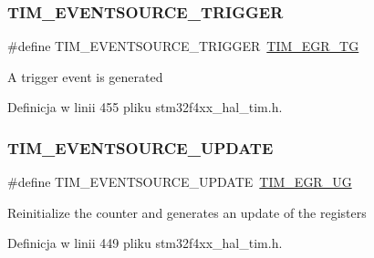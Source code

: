 \subsubsection{\texorpdfstring{T\+I\+M\+\_\+\+E\+V\+E\+N\+T\+S\+O\+U\+R\+C\+E\+\_\+\+T\+R\+I\+G\+G\+ER}{TIM\_EVENTSOURCE\_TRIGGER}}
{\footnotesize\ttfamily \#define T\+I\+M\+\_\+\+E\+V\+E\+N\+T\+S\+O\+U\+R\+C\+E\+\_\+\+T\+R\+I\+G\+G\+ER~\hyperlink{group___peripheral___registers___bits___definition_ga2eabface433d6adaa2dee3df49852585}{T\+I\+M\+\_\+\+E\+G\+R\+\_\+\+TG}}

A trigger event is generated 

Definicja w linii 455 pliku stm32f4xx\+\_\+hal\+\_\+tim.\+h.

\mbox{\label{group___t_i_m___event___source_ga6b9d1352735d2ddbafcaa31ae05cd1ee}} 
\subsubsection{\texorpdfstring{T\+I\+M\+\_\+\+E\+V\+E\+N\+T\+S\+O\+U\+R\+C\+E\+\_\+\+U\+P\+D\+A\+TE}{TIM\_EVENTSOURCE\_UPDATE}}
{\footnotesize\ttfamily \#define T\+I\+M\+\_\+\+E\+V\+E\+N\+T\+S\+O\+U\+R\+C\+E\+\_\+\+U\+P\+D\+A\+TE~\hyperlink{group___peripheral___registers___bits___definition_ga16f52a8e9aad153223405b965566ae91}{T\+I\+M\+\_\+\+E\+G\+R\+\_\+\+UG}}

Reinitialize the counter and generates an update of the registers 

Definicja w linii 449 pliku stm32f4xx\+\_\+hal\+\_\+tim.\+h.

